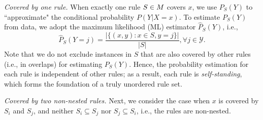 \smallskip \noindent
\emph{Covered by one rule.} 
When exactly one rule $S \in M$ covers $x$, we use $P_S(Y)$ to ``approximate" the conditional probability $P(Y|X=x)$. To estimate $P_S(Y)$ from data, we adopt the maximum likelihood (ML) estimator $\hat{P}_S(Y)$, i.e.,
\begin{equation}
\hat{P}_S(Y = j) = \frac{|\{(x,y): x \in S, y = j\}|}{|S|}, \forall j \in \mathscr{Y}. 
\end{equation}
Note that we do not exclude instances in $S$ that are also covered by other rules (i.e., in overlaps) for estimating $P_S(Y)$. Hence, the probability estimation for each rule is independent of other rules; as a result, each rule is \emph{self-standing}, which forms the foundation of a truly unordered rule set. 

\smallskip \noindent
\emph{Covered by two non-nested rules.}
Next, we consider the case when $x$ is covered by 
$S_i$ and $S_j$, and neither $S_i \subseteq S_j$ nor $S_j \subseteq S_i$, i.e., the rules are non-nested.  

